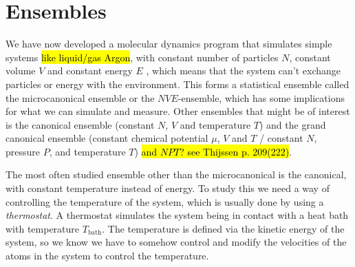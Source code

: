 \chapter{Ensembles}

We have now developed a molecular dynamics program that simulates simple systems \hl{like liquid/gas Argon}, with constant number of particles $N$, constant volume $V$ and constant energy $E$ %
, which means that the system can't exchange particles or energy with the environment. This forms a statistical ensemble called the microcanonical ensemble or the $NVE$-ensemble, which has some implications for what we can simulate and measure. Other ensembles that might be of interest is the canonical ensemble (constant $N$, $V$ and temperature $T$) and the grand canonical ensemble (constant chemical potential $\mu$, $V$ and $T$ / constant $N$, pressure $P$, and temperature $T$) \hl{and $NPT$? see Thijssen p. 209(222)}.


The most often studied ensemble other than the microcanonical is the canonical, with constant temperature instead of energy. To study this we need a way of controlling the temperature of the system, which is usually done by using a \emph{thermostat}. A thermostat simulates the system being in contact with a heat bath with temperature $T_\text{bath}$.  The temperature is defined via the kinetic energy of the system, so we know we have to somehow control and modify the velocities of the atoms in the system to control the temperature.
% 

